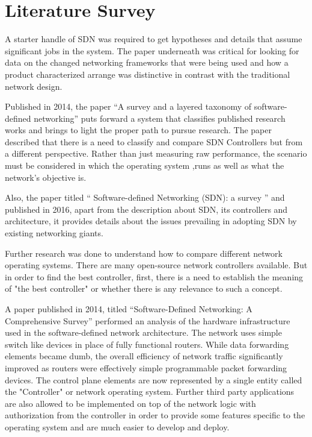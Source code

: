 \chapter{Literature Survey}

A starter handle of SDN was required to get hypotheses and details that assume significant jobs in the system. The paper underneath was critical for looking for data on the changed networking frameworks that were being used and how a product characterized arrange was distinctive in contrast with the traditional network design.

Published in 2014, the paper ``A survey and a layered taxonomy of software-defined networking'' \cite{taxonomy2014} puts forward a system that classifies published research works and brings to light the proper path to pursue research. The paper described that there is a need to classify and compare SDN Controllers but from a different perspective. Rather than just measuring raw performance, the scenario must be considered in which the operating system ,runs as well as what the network's objective is.

Also, the paper titled `` Software-defined Networking (SDN): a survey ''\cite{benzekki2016survey} and published in 2016, apart from the description about SDN, its controllers and architecture, it provides details about the issues prevailing in adopting SDN by existing networking giants.

Further research was done to understand how to compare different network operating systems. There are many open-source network controllers available. But in order to find the best controller, first, there is a need to establish the meaning of "the best controller" or whether there is any relevance to such a concept.

A paper published in 2014, titled ``Software-Defined Networking: A Comprehensive Survey'' \cite{Survey2014} performed an analysis of the hardware infrastructure used in the software-defined network architecture. The network uses simple switch like devices in place of fully functional routers. While data forwarding elements became dumb, the overall efficiency of network traffic significantly improved as routers were effectively simple programmable packet forwarding devices. The control plane elements are now represented by a single entity called the "Controller" or network operating system. Further third party applications are also allowed to be implemented on top of the network logic with authorization from the controller in order to provide some features specific to the operating system and are much easier to develop and deploy.

